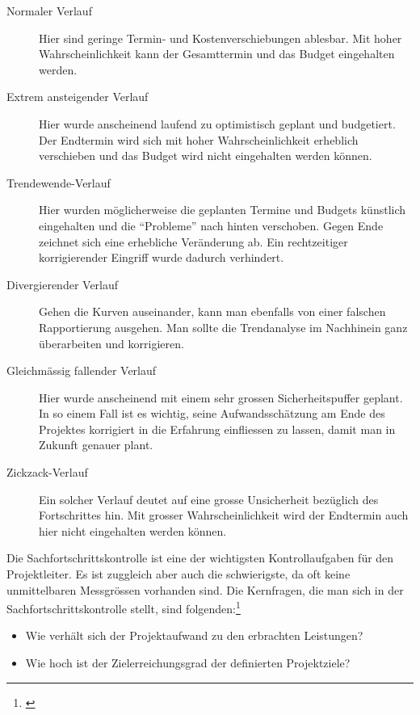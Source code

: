 \begin{description}
    \item [Normaler Verlauf] Hier sind geringe Termin- und Kostenverschiebungen 
    ablesbar. Mit hoher Wahrscheinlichkeit kann der Gesamttermin und das Budget 
    eingehalten werden.

    \item [Extrem ansteigender Verlauf] Hier wurde anscheinend laufend zu optimistisch geplant 
    und budgetiert. Der Endtermin wird sich mit hoher Wahrscheinlichkeit erheblich 
    verschieben und das Budget wird nicht eingehalten werden können.

    \item [Trendewende-Verlauf] Hier wurden möglicherweise die geplanten Termine 
    und Budgets künstlich eingehalten und die ``Probleme'' nach hinten verschoben. 
    Gegen Ende zeichnet sich eine erhebliche Veränderung ab. Ein rechtzeitiger 
    korrigierender Eingriff wurde dadurch verhindert.

    \item [Divergierender Verlauf] Gehen die Kurven auseinander, kann man ebenfalls 
    von einer falschen Rapportierung ausgehen. Man sollte die Trendanalyse im 
    Nachhinein ganz überarbeiten und korrigieren.
    
    \item [Gleichmässig fallender Verlauf] Hier wurde anscheinend mit einem sehr 
    grossen Sicherheitspuffer geplant. In so einem Fall ist es wichtig, seine
    Aufwandsschätzung am Ende des Projektes korrigiert in die Erfahrung einfliessen
    zu lassen, damit man in Zukunft genauer plant.
    
    \item [Zickzack-Verlauf] Ein solcher Verlauf deutet auf eine grosse
    Unsicherheit bezüglich des Fortschrittes hin. Mit grosser Wahrscheinlichkeit
    wird der Endtermin auch hier nicht eingehalten werden können.
\end{description}

Die Sachfortschrittskontrolle ist eine der wichtigsten Kontrollaufgaben für
den Projektleiter. Es ist zuggleich aber auch die schwierigste, da oft keine
unmittelbaren Messgrössen vorhanden sind.
Die Kernfragen, die man sich in der Sachfortschrittskontrolle stellt, sind folgenden:\footnote{\citealp*[Vgl.][S. 134]{jenny2009projektmanagement}}

\begin{itemize}
    \item Wie verhält sich der Projektaufwand zu den erbrachten Leistungen?
    \item Wie hoch ist der Zielerreichungsgrad der definierten Projektziele?
\end{itemize}

